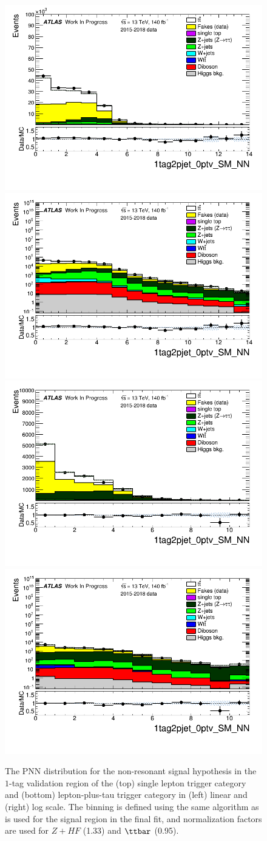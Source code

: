 \begin{figure}
\centering
\includegraphics[width=.45\textwidth]{figures/lephadFF/SLT/1tag2pjet_0ptv_SM_NN_SLT_ALLFAKES_Bulb_noNeg_lin.png}
\includegraphics[width=.45\textwidth]{figures/lephadFF/SLT/1tag2pjet_0ptv_SM_NN_SLT_ALLFAKES_Bulb_noNeg_log.png}\\
\includegraphics[width=.45\textwidth]{figures/lephadFF/LTT/1tag2pjet_0ptv_SM_NN_LTT_ALLFAKES_Bulb_noNeg_lin.png}
\includegraphics[width=.45\textwidth]{figures/lephadFF/LTT/1tag2pjet_0ptv_SM_NN_LTT_ALLFAKES_Bulb_noNeg_log.png}\\
\caption{The PNN distribution for the non-resonant signal hypothesis in the $1$-tag validation region of the (top) single lepton trigger category and (bottom) lepton-plus-tau trigger category in (left) linear and (right) log scale. The binning is defined using the same algorithm as is used for the signal region in the final fit, and normalization factors are used for $Z+HF$ (1.33) and $\ttbar$ (0.95).}
\label{fig:SLT_LTT_1tag_NN}
\end{figure}

